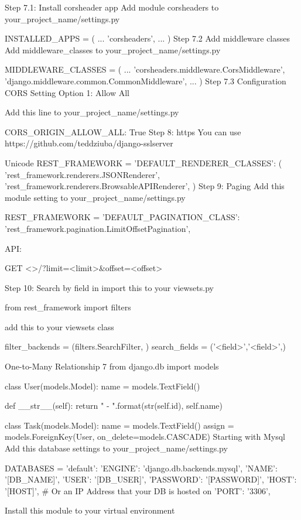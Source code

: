 Step 7.1: Install corsheader app
Add module corsheaders to your_project_name/settings.py

INSTALLED_APPS = (
    ...
    'corsheaders',
    ...
)
Step 7.2 Add middleware classes
Add middleware_classes to your_project_name/settings.py

MIDDLEWARE_CLASSES = (
    ...
    'corsheaders.middleware.CorsMiddleware',
    'django.middleware.common.CommonMiddleware',
    ...
)
Step 7.3 Configuration CORS Setting
Option 1: Allow All

Add this line to your_project_name/settings.py

CORS_ORIGIN_ALLOW_ALL: True
Step 8: https
You can use https://github.com/teddziuba/django-sslserver

Unicode
REST_FRAMEWORK = {
    'DEFAULT_RENDERER_CLASSES': (
        'rest_framework.renderers.JSONRenderer',
        'rest_framework.renderers.BrowsableAPIRenderer',
    )
}
Step 9: Paging
Add this module setting to your_project_name/settings.py


REST_FRAMEWORK = {
    'DEFAULT_PAGINATION_CLASS': 'rest_framework.pagination.LimitOffsetPagination',
}

API:


GET <>/?limit=<limit>&offset=<offset>

Step 10: Search by field in
import this to your viewsets.py


from rest_framework import filters

add this to your viewsets class


filter_backends = (filters.SearchFilter, )
search_fields = ('<field>','<field>',)

One-to-Many Relationship 7
from django.db import models

class User(models.Model):
    name = models.TextField()

    def __str__(self):
        return "{} - {}".format(str(self.id), self.name)


class Task(models.Model):
    name = models.TextField()
    assign = models.ForeignKey(User, on_delete=models.CASCADE)
Starting with Mysql
Add this database settings to your_project_name/settings.py


DATABASES = {
    'default': {
        'ENGINE': 'django.db.backends.mysql',
        'NAME': '[DB_NAME]',
        'USER': '[DB_USER]',
        'PASSWORD': '[PASSWORD]',
        'HOST': '[HOST]',   # Or an IP Address that your DB is hosted on
        'PORT': '3306',
    }
}

Install this module to your virtual environment


